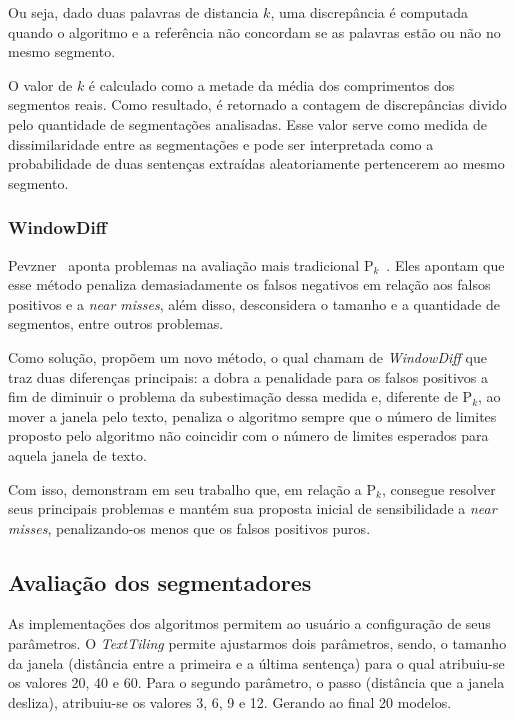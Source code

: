 Ou seja, dado duas palavras de distancia $k$, uma discrepância é computada quando o algoritmo e a referência não concordam se as palavras estão ou não no mesmo segmento.

O valor de $k$ é calculado como a metade da média dos comprimentos dos segmentos reais. Como resultado, é retornado a contagem de discrepâncias divido pelo quantidade de segmentações analisadas. Esse valor serve como medida de dissimilaridade entre as segmentações e pode ser interpretada como a probabilidade de duas sentenças extraídas aleatoriamente pertencerem ao mesmo segmento.



\subsubsection{WindowDiff}

Pevzner~\cite{Pevzner2002} aponta problemas na avaliação mais tradicional P$_k$~\cite{Beeferman1999}. Eles apontam que esse método penaliza demasiadamente os falsos negativos em relação aos falsos positivos e a \textit{near misses}, além disso, desconsidera o tamanho e a quantidade de segmentos, entre outros problemas.

Como solução, propõem um novo método, o qual chamam de \textit{WindowDiff} que traz duas diferenças principais: a dobra a penalidade para os falsos positivos a fim de diminuir o problema da subestimação dessa medida e, diferente de P$_k$, ao mover a janela pelo texto, penaliza o algoritmo sempre que o número de limites proposto pelo algoritmo não coincidir com o número de limites esperados para aquela janela de texto. 

Com isso, demonstram em seu trabalho que, em relação a P$_k$, consegue resolver seus principais problemas e mantém sua proposta inicial de sensibilidade a \textit{near misses}, penalizando-os menos que os falsos positivos puros.


  



\subsection{Avaliação dos segmentadores}


As implementações dos algoritmos permitem ao usuário a configuração de seus parâmetros. 
%
O \textit{TextTiling} permite ajustarmos dois parâmetros, sendo, o tamanho da janela (distância entre a primeira e a última sentença) para o qual atribuiu-se os valores 20, 40 e 60. Para o segundo parâmetro, o passo (distância que a janela desliza), atribuiu-se os valores 3, 6, 9 e 12. Gerando ao final 20 modelos.
%

